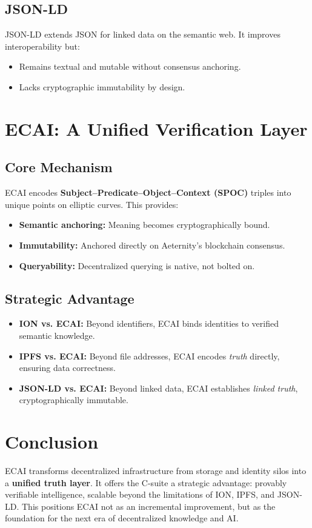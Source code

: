 \documentclass[12pt]{article}
\begin{document}
\subsection{JSON-LD}
JSON-LD extends JSON for linked data on the semantic web. It improves interoperability but:
\begin{itemize}[leftmargin=*]
    \item Remains textual and mutable without consensus anchoring.
    \item Lacks cryptographic immutability by design.
\end{itemize}

\section{ECAI: A Unified Verification Layer}
\subsection{Core Mechanism}
ECAI encodes \textbf{Subject–Predicate–Object–Context (SPOC)} triples into unique points on elliptic curves.  
This provides:
\begin{itemize}[leftmargin=*]
    \item \textbf{Semantic anchoring:} Meaning becomes cryptographically bound.
    \item \textbf{Immutability:} Anchored directly on Aeternity’s blockchain consensus.
    \item \textbf{Queryability:} Decentralized querying is native, not bolted on.
\end{itemize}

\subsection{Strategic Advantage}
\begin{itemize}[leftmargin=*]
    \item \textbf{ION vs. ECAI:} Beyond identifiers, ECAI binds identities to verified semantic knowledge.
    \item \textbf{IPFS vs. ECAI:} Beyond file addresses, ECAI encodes \emph{truth} directly, ensuring data correctness.
    \item \textbf{JSON-LD vs. ECAI:} Beyond linked data, ECAI establishes \emph{linked truth}, cryptographically immutable.
\end{itemize}

\section*{Conclusion}
ECAI transforms decentralized infrastructure from storage and identity silos into a \textbf{unified truth layer}.  
It offers the C-suite a strategic advantage: provably verifiable intelligence, scalable beyond the limitations of ION, IPFS, and JSON-LD.  
This positions ECAI not as an incremental improvement, but as the foundation for the next era of decentralized knowledge and AI.
\end{document}
